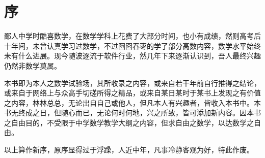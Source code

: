 
\chapter*{序}

鄙人中学时酷喜数学，在数学学科上花费了大部分时间，也小有成绩，然则高考后十年间，未曾认真学习过数学，不过囫囵吞枣的学了部分高数内容，数学水平始终未有什么进展。现今随波逐流于软件行业，然几年下来逐渐认识到，吾人最终兴趣仍然非数学莫属。

本书即为本人之数学试验场，其所收录之内容，或来自若干年前自行推得之结论，或来自于网络上与众高手切磋所得之精品，或来自某日某时于某书上发现之有价值之内容，林林总总，无论出自自己或他人，但凡本人有兴趣者，皆收入本书中。本书无终成之日，但随心而已，无论何时何地，兴之所致，皆可添加新内容。因本书之自由目的，不受限于中学数学教学大纲之内容，但求自由之数学，以达数学之自由。

以上算作新序，原序显得过于浮躁，人近中年，凡事冷静客观为好，特此作废。

